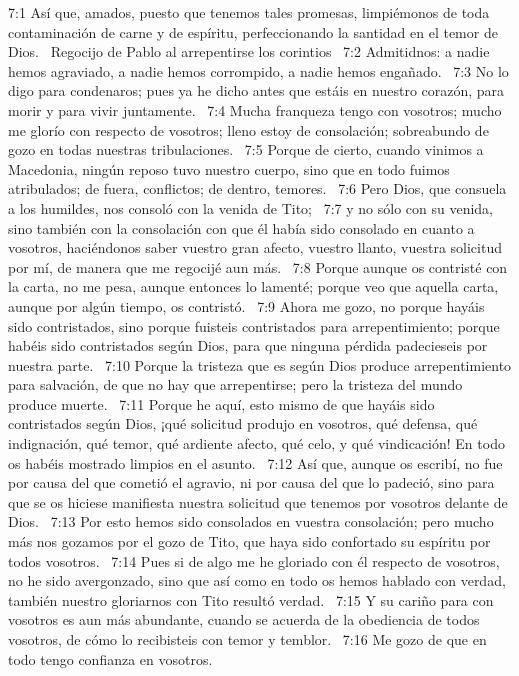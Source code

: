 7:1 Así que, amados, puesto que tenemos tales promesas, limpiémonos de toda contaminación de carne y de espíritu, perfeccionando la santidad en el temor de Dios.  
Regocijo de Pablo al arrepentirse los corintios  
7:2 Admitidnos: a nadie hemos agraviado, a nadie hemos corrompido, a nadie hemos engañado.  
7:3 No lo digo para condenaros; pues ya he dicho antes que estáis en nuestro corazón, para morir y para vivir juntamente.  
7:4 Mucha franqueza tengo con vosotros; mucho me glorío con respecto de vosotros; lleno estoy de consolación; sobreabundo de gozo en todas nuestras tribulaciones.  
7:5 Porque de cierto, cuando vinimos a Macedonia,  ningún reposo tuvo nuestro cuerpo, sino que en todo fuimos atribulados; de fuera, conflictos; de dentro, temores.  
7:6 Pero Dios, que consuela a los humildes, nos consoló con la venida de Tito;  
7:7 y no sólo con su venida, sino también con la consolación con que él había sido consolado en cuanto a vosotros, haciéndonos saber vuestro gran afecto, vuestro llanto, vuestra solicitud por mí, de manera que me regocijé aun más.  
7:8 Porque aunque os contristé con la carta, no me pesa, aunque entonces lo lamenté; porque veo que aquella carta, aunque por algún tiempo, os contristó.  
7:9 Ahora me gozo, no porque hayáis sido contristados, sino porque fuisteis contristados para arrepentimiento; porque habéis sido contristados según Dios, para que ninguna pérdida padecieseis por nuestra parte.  
7:10 Porque la tristeza que es según Dios produce arrepentimiento para salvación, de que no hay que arrepentirse; pero la tristeza del mundo produce muerte.  
7:11 Porque he aquí, esto mismo de que hayáis sido contristados según Dios, ¡qué solicitud produjo en vosotros, qué defensa, qué indignación, qué temor, qué ardiente afecto, qué celo, y qué vindicación! En todo os habéis mostrado limpios en el asunto.  
7:12 Así que, aunque os escribí, no fue por causa del que cometió el agravio, ni por causa del que lo padeció, sino para que se os hiciese manifiesta nuestra solicitud que tenemos por vosotros delante de Dios.  
7:13 Por esto hemos sido consolados en vuestra consolación; pero mucho más nos gozamos por el gozo de Tito, que haya sido confortado su espíritu por todos vosotros.  
7:14 Pues si de algo me he gloriado con él respecto de vosotros, no he sido avergonzado, sino que así como en todo os hemos hablado con verdad, también nuestro gloriarnos con Tito resultó verdad.  
7:15 Y su cariño para con vosotros es aun más abundante, cuando se acuerda de la obediencia de todos vosotros, de cómo lo recibisteis con temor y temblor.  
7:16 Me gozo de que en todo tengo confianza en vosotros.  
